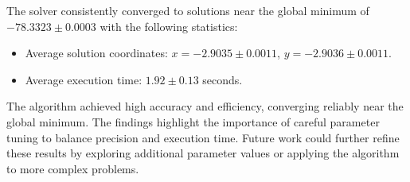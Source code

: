 \documentclass[11pt,a4paper,twoside]{article}
\begin{document}
The solver consistently converged to solutions near the global minimum of $-78.3323 \pm 0.0003$ with the following statistics: \begin{itemize} \item Average solution coordinates: $x = -2.9035 \pm 0.0011$, $y = -2.9036 \pm 0.0011$. \item Average execution time: $1.92 \pm 0.13$ seconds. \end{itemize} 

The algorithm achieved high accuracy and efficiency, converging reliably near the global minimum. The findings highlight the importance of careful parameter tuning to balance precision and execution time. Future work could further refine these results by exploring additional parameter values or applying the algorithm to more complex problems.
\end{document}
